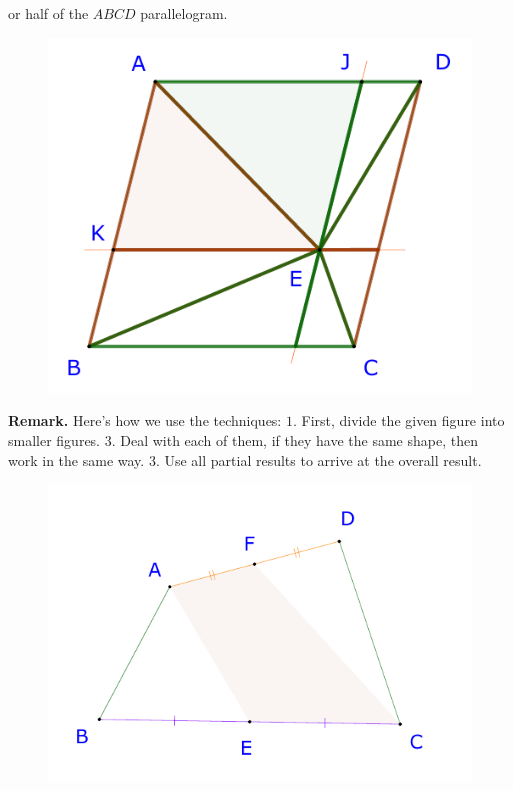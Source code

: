 \begin{multicols}{2}
	or half of the $ABCD$ parallelogram.
	\begin{figure}[H]
		\centering
		\captionsetup{labelformat= empty, justification=centering}
		\includegraphics[width= 0.95\linewidth]{23-24-s3-i-p1-s.pdf}
		\vspace*{-10pt} 
	\end{figure}
	\textbf{\color{toancuabi}Remark.} Here's how we use the techniques:
	\vskip 0.1cm
	$1.$ First, divide the given figure into smaller figures.
	\vskip 0.1cm
	$3$. Deal with each of them, if they have the same shape, then work in the same way.
	\vskip 0.1cm
	$3.$ Use all partial results to arrive at the overall result.
	\vskip 0.2cm
		\begin{figure}[H]
		\vspace*{-10pt}
		\centering
		\captionsetup{labelformat= empty, justification=centering}
		\includegraphics[width= 1\linewidth]{23-24-s3-i-p2.pdf}

\end{figure}
\end{multicols}
